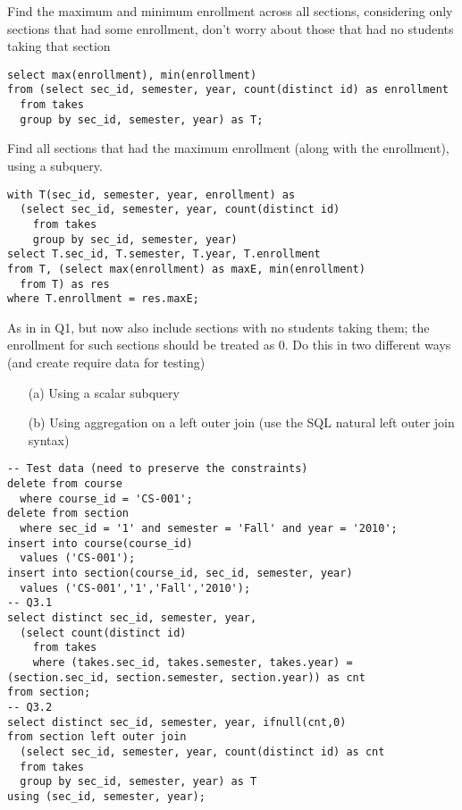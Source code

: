 \documentclass[logo,reportComp]{thesis}
\begin{document}
\begin{question}
\normalfont 
Find the maximum and minimum enrollment across all sections, considering only sections that had some enrollment, don't worry about those that had no students taking that section
\end{question}
\begin{answer}\mbox{}\par
\begin{lstlisting}
select max(enrollment), min(enrollment)
from (select sec_id, semester, year, count(distinct id) as enrollment
  from takes
  group by sec_id, semester, year) as T;
\end{lstlisting}
\end{answer}

\begin{question}
\normalfont 
Find all sections that had the maximum enrollment (along with the enrollment), using a subquery.
\end{question}
\begin{answer}\mbox{}\par
\begin{lstlisting}
with T(sec_id, semester, year, enrollment) as
  (select sec_id, semester, year, count(distinct id)
    from takes
    group by sec_id, semester, year)
select T.sec_id, T.semester, T.year, T.enrollment
from T, (select max(enrollment) as maxE, min(enrollment)
  from T) as res
where T.enrollment = res.maxE;
\end{lstlisting}
\end{answer}

\begin{question}
\normalfont 
As in in Q1, but now also include sections with no students taking them; the enrollment for such sections should be treated as 0. Do this in two different ways (and create require data for testing)
\begin{itemize}
\item [(a)] Using a scalar subquery
\item [(b)] Using aggregation on a left outer join (use the SQL natural left outer join syntax)
\end{itemize}
\end{question}
\begin{answer}\mbox{}\par
\begin{lstlisting}
-- Test data (need to preserve the constraints)
delete from course
  where course_id = 'CS-001';
delete from section
  where sec_id = '1' and semester = 'Fall' and year = '2010';
insert into course(course_id)
  values ('CS-001');
insert into section(course_id, sec_id, semester, year)
  values ('CS-001','1','Fall','2010');
-- Q3.1
select distinct sec_id, semester, year,
  (select count(distinct id)
    from takes
    where (takes.sec_id, takes.semester, takes.year) = (section.sec_id, section.semester, section.year)) as cnt
from section;
-- Q3.2
select distinct sec_id, semester, year, ifnull(cnt,0)
from section left outer join
  (select sec_id, semester, year, count(distinct id) as cnt
  from takes
  group by sec_id, semester, year) as T
using (sec_id, semester, year);
\end{lstlisting}
\end{answer}
\end{document}
